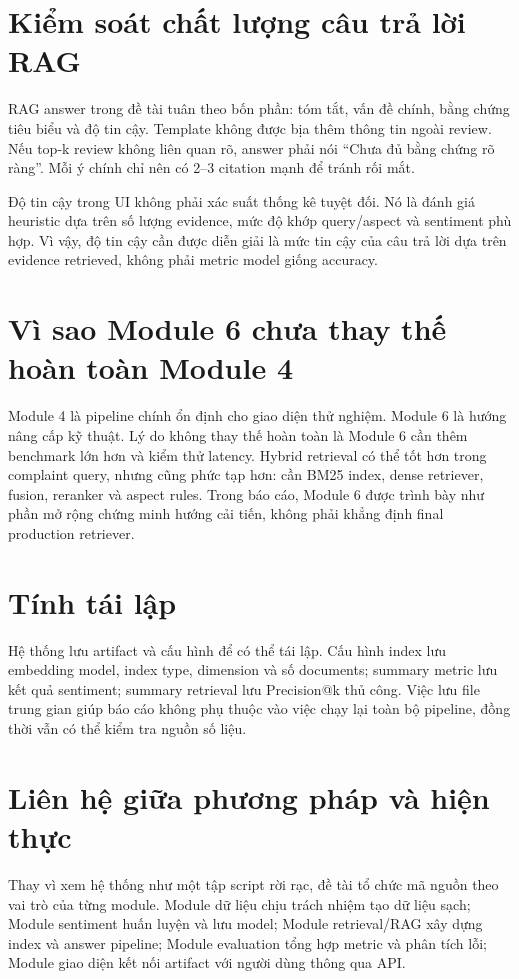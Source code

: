 \section{Kiểm soát chất lượng câu trả lời RAG}
RAG answer trong đề tài tuân theo bốn phần: tóm tắt, vấn đề chính, bằng chứng tiêu biểu và độ tin cậy. Template không được bịa thêm thông tin ngoài review. Nếu top-k review không liên quan rõ, answer phải nói “Chưa đủ bằng chứng rõ ràng”. Mỗi ý chính chỉ nên có 2--3 citation mạnh để tránh rối mắt.

Độ tin cậy trong UI không phải xác suất thống kê tuyệt đối. Nó là đánh giá heuristic dựa trên số lượng evidence, mức độ khớp query/aspect và sentiment phù hợp. Vì vậy, độ tin cậy cần được diễn giải là mức tin cậy của câu trả lời dựa trên evidence retrieved, không phải metric model giống accuracy.

\section{Vì sao Module 6 chưa thay thế hoàn toàn Module 4}
Module 4 là pipeline chính ổn định cho giao diện thử nghiệm. Module 6 là hướng nâng cấp kỹ thuật. Lý do không thay thế hoàn toàn là Module 6 cần thêm benchmark lớn hơn và kiểm thử latency. Hybrid retrieval có thể tốt hơn trong complaint query, nhưng cũng phức tạp hơn: cần BM25 index, dense retriever, fusion, reranker và aspect rules. Trong báo cáo, Module 6 được trình bày như phần mở rộng chứng minh hướng cải tiến, không phải khẳng định final production retriever.

\section{Tính tái lập}
Hệ thống lưu artifact và cấu hình để có thể tái lập. Cấu hình index lưu embedding model, index type, dimension và số documents; summary metric lưu kết quả sentiment; summary retrieval lưu Precision@k thủ công. Việc lưu file trung gian giúp báo cáo không phụ thuộc vào việc chạy lại toàn bộ pipeline, đồng thời vẫn có thể kiểm tra nguồn số liệu.

\section{Liên hệ giữa phương pháp và hiện thực}
Thay vì xem hệ thống như một tập script rời rạc, đề tài tổ chức mã nguồn theo vai trò của từng module. Module dữ liệu chịu trách nhiệm tạo dữ liệu sạch; Module sentiment huấn luyện và lưu model; Module retrieval/RAG xây dựng index và answer pipeline; Module evaluation tổng hợp metric và phân tích lỗi; Module giao diện kết nối artifact với người dùng thông qua API.

